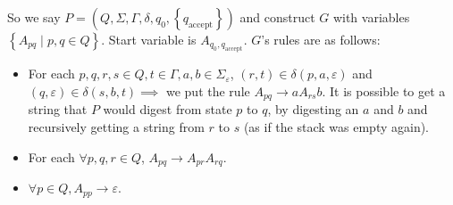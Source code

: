 \documentclass[12 pt]{article}
\begin{document}
So we say $P = (Q, \Sigma, \Gamma, \delta, q_0,
\left\{q_{\text{accept}}\right\})$ and construct $G$ with variables
$\left\{A_{pq} \mid p, q \in Q\right\}$. Start variable is $A_{q_0,
  q_{\text{accept}}}$. $G$'s rules are as follows:
\begin{itemize}
\item For each $p,q,r,s \in Q, t \in \Gamma, a,b \in
  \Sigma_{\varepsilon}$, $(r,t) \in \delta(p, a, \varepsilon)$ and
  $(q,\varepsilon) \in \delta(s,b,t) \implies $ we put the rule
  $A_{pq} \to aA_{rs}b$. It is possible to get a string that $P$ would
  digest from state $p$ to $q$, by digesting an $a$ and $b$ and
  recursively getting a string from $r$ to $s$ (as if the stack was
  empty again).
\item For each $\forall p,q,r \in Q$, $A_{pq} \to A_{pr}A_{rq}$.
\item $\forall p \in Q, A_{pp} \to \varepsilon$.
\end{itemize}
\end{document}

